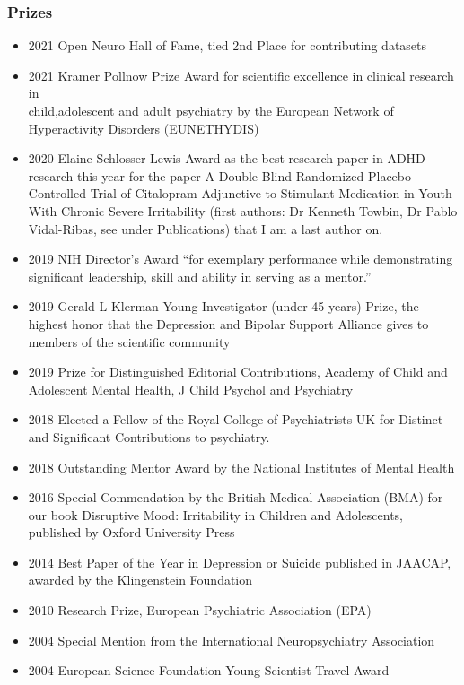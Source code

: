 \documentclass[
]{article}
\providecommand{\tightlist}{%
  \setlength{\itemsep}{0pt}\setlength{\parskip}{0pt}}
\begin{document}
\hypertarget{prizes}{%
\subsubsection{Prizes}\label{prizes}}

\begin{itemize}
\tightlist
\item
  2021 Open Neuro Hall of Fame, tied 2nd Place for contributing datasets
\item
  2021 Kramer Pollnow Prize Award for scientific excellence in clinical
  research in\\
  child,adolescent and adult psychiatry by the European Network of
  Hyperactivity Disorders (EUNETHYDIS)
\item
  2020 Elaine Schlosser Lewis Award as the best research paper in ADHD
  research this year for the paper A Double-Blind Randomized
  Placebo-Controlled Trial of Citalopram Adjunctive to Stimulant
  Medication in Youth With Chronic Severe Irritability (first authors:
  Dr Kenneth Towbin, Dr Pablo Vidal-Ribas, see under Publications) that
  I am a last author on.
\item
  2019 NIH Director's Award ``for exemplary performance while
  demonstrating significant leadership, skill and ability in serving as
  a mentor.''\\
\item
  2019 Gerald L Klerman Young Investigator (under 45 years) Prize, the
  highest honor that the Depression and Bipolar Support Alliance gives
  to members of the scientific community
\item
  2019 Prize for Distinguished Editorial Contributions, Academy of Child
  and Adolescent Mental Health, J Child Psychol and Psychiatry
\item
  2018 Elected a Fellow of the Royal College of Psychiatrists UK for
  Distinct and Significant Contributions to psychiatry.
\item
  2018 Outstanding Mentor Award by the National Institutes of Mental
  Health
\item
  2016 Special Commendation by the British Medical Association (BMA) for
  our book Disruptive Mood: Irritability in Children and Adolescents,
  published by Oxford University Press
\item
  2014 Best Paper of the Year in Depression or Suicide published in
  JAACAP, awarded by the Klingenstein Foundation
\item
  2010 Research Prize, European Psychiatric Association (EPA)\\
\item
  2004 Special Mention from the International Neuropsychiatry
  Association
\item
  2004 European Science Foundation Young Scientist Travel Award
\end{itemize}
\end{document}
